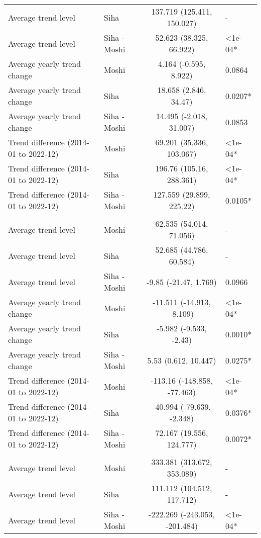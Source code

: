 \begin{longtable}{l|lcl}
Average trend level & Siha & 137.719 (125.411, 150.027) & - \\ 
Average trend level & Siha - Moshi & 52.623 (38.325, 66.922) & <1e-04* \\ 
Average yearly trend change & Moshi & 4.164 (-0.595, 8.922) & 0.0864 \\ 
Average yearly trend change & Siha & 18.658 (2.846, 34.47) & 0.0207* \\ 
Average yearly trend change & Siha - Moshi & 14.495 (-2.018, 31.007) & 0.0853 \\ 
Trend difference (2014-01 to 2022-12) & Moshi & 69.201 (35.336, 103.067) & <1e-04* \\ 
Trend difference (2014-01 to 2022-12) & Siha & 196.76 (105.16, 288.361) & <1e-04* \\ 
Trend difference (2014-01 to 2022-12) & Siha - Moshi & 127.559 (29.899, 225.22) & 0.0105* \\ 
\midrule\addlinespace[2.5pt]
\multicolumn{4}{l}{Malnutrition} \\[2.5pt] 
\midrule\addlinespace[2.5pt]
Average trend level & Moshi & 62.535 (54.014, 71.056) & - \\ 
Average trend level & Siha & 52.685 (44.786, 60.584) & - \\ 
Average trend level & Siha - Moshi & -9.85 (-21.47, 1.769) & 0.0966 \\ 
Average yearly trend change & Moshi & -11.511 (-14.913, -8.109) & <1e-04* \\ 
Average yearly trend change & Siha & -5.982 (-9.533, -2.43) & 0.0010* \\ 
Average yearly trend change & Siha - Moshi & 5.53 (0.612, 10.447) & 0.0275* \\ 
Trend difference (2014-01 to 2022-12) & Moshi & -113.16 (-148.858, -77.463) & <1e-04* \\ 
Trend difference (2014-01 to 2022-12) & Siha & -40.994 (-79.639, -2.348) & 0.0376* \\ 
Trend difference (2014-01 to 2022-12) & Siha - Moshi & 72.167 (19.556, 124.777) & 0.0072* \\ 
\midrule\addlinespace[2.5pt]
\multicolumn{4}{l}{Neurological} \\[2.5pt] 
\midrule\addlinespace[2.5pt]
Average trend level & Moshi & 333.381 (313.672, 353.089) & - \\ 
Average trend level & Siha & 111.112 (104.512, 117.712) & - \\ 
Average trend level & Siha - Moshi & -222.269 (-243.053, -201.484) & <1e-04* \\ 

\end{longtable}
